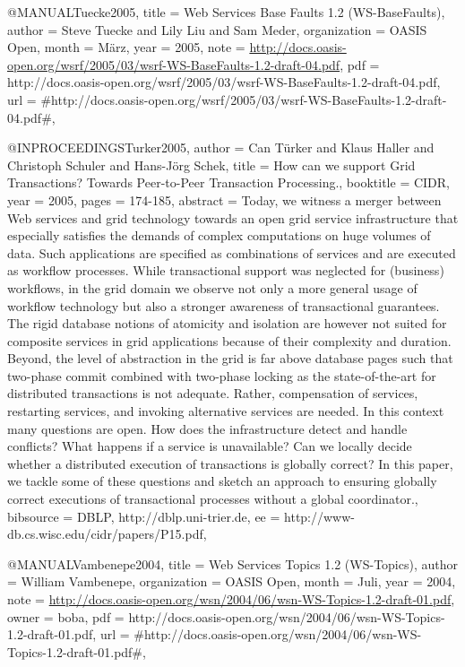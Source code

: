 @MANUAL{Tuecke2005,
  title = {{Web Services Base Faults 1.2 (WS-BaseFaults)}},
  author = {Steve Tuecke and Lily Liu and Sam Meder},
  organization = {OASIS Open},
  month = {März},
  year = {2005},
  note = {\url{http://docs.oasis-open.org/wsrf/2005/03/wsrf-WS-BaseFaults-1.2-draft-04.pdf}},
  pdf = {http://docs.oasis-open.org/wsrf/2005/03/wsrf-WS-BaseFaults-1.2-draft-04.pdf},
  url = {#http://docs.oasis-open.org/wsrf/2005/03/wsrf-WS-BaseFaults-1.2-draft-04.pdf#},
}

@INPROCEEDINGS{Turker2005,
  author = {Can Türker and Klaus Haller and Christoph Schuler and Hans-Jörg Schek},
  title = {{How can we support Grid Transactions? Towards Peer-to-Peer Transaction
	Processing.}},
  booktitle = {CIDR},
  year = {2005},
  pages = {174-185},
  abstract = {Today, we witness a merger between Web services and grid technology
towards
	an open grid service infrastructure that especially satisfies
the
	demands of complex computations on huge volumes of data. Such
applications
	are specified as combinations of services and are executed as
workflow
	processes. While transactional support was neglected for
(business)
	workflows, in the grid domain we observe not only a more
general
	usage of workflow technology but also a stronger awareness of
transactional
	guarantees. The rigid database notions of atomicity
and isolation
	are however not suited for composite services in grid
applications
	because of their complexity and duration. Beyond, the level of
abstraction
	in the grid is far above database pages such that two-phase
commit
	combined with two-phase locking as the state-of-the-art for
distributed
	transactions is not adequate. Rather, compensation of
services, restarting
	services, and invoking alternative services
are needed. In this context
	many questions are open. How does the
infrastructure detect and handle
	conflicts? What happens if a service is
unavailable? Can we locally
	decide whether a distributed execution of
transactions is globally
	correct? In this paper, we tackle some of
these questions and sketch
	an approach to ensuring globally correct
executions of transactional
	processes without a global coordinator.},
  bibsource = {DBLP, http://dblp.uni-trier.de},
  ee = {http://www-db.cs.wisc.edu/cidr/papers/P15.pdf},
}

@MANUAL{Vambenepe2004,
  title = {{Web Services Topics 1.2 (WS-Topics)}},
  author = {William Vambenepe},
  organization = {OASIS Open},
  month = {Juli},
  year = {2004},
  note = {\url{http://docs.oasis-open.org/wsn/2004/06/wsn-WS-Topics-1.2-draft-01.pdf}},
  owner = {boba},
  pdf = {http://docs.oasis-open.org/wsn/2004/06/wsn-WS-Topics-1.2-draft-01.pdf},
  url = {#http://docs.oasis-open.org/wsn/2004/06/wsn-WS-Topics-1.2-draft-01.pdf#},
}

